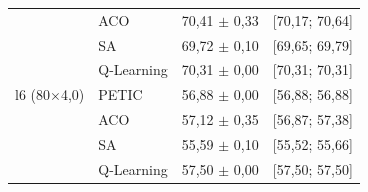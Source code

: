 \begin{table}[htb]
\begin{tabular}{llcc}
         & ACO & 70,41 $\pm$ 0,33 & [70,17; 70,64] \\
         & SA & 69,72 $\pm$ 0,10 & [69,65; 69,79] \\
         & Q-Learning & 70,31 $\pm$ 0,00 & [70,31; 70,31] \\
        \hline
        l6 (80$\times$4,0) & PETIC & 56,88 $\pm$ 0,00 & [56,88; 56,88] \\
         & ACO & 57,12 $\pm$ 0,35 & [56,87; 57,38] \\
         & SA & 55,59 $\pm$ 0,10 & [55,52; 55,66] \\
         & Q-Learning & 57,50 $\pm$ 0,00 & [57,50; 57,50] \\
        \hline
    \end{tabular}
\end{table}
